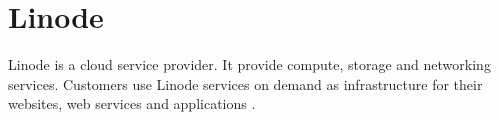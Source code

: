 \section{Linode}

Linode is a cloud service provider. It provide compute, storage and networking services. Customers use Linode services on demand as infrastructure for their websites, web services and applications \cites{hid-sp18-511-linode}.
